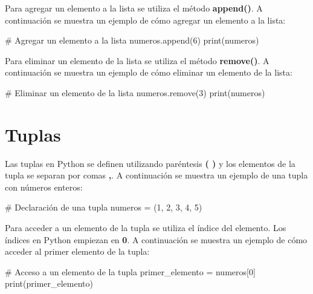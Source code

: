 \documentclass[
  a4paper,
  DIV=11,
  numbers=noendperiod,
  onepage,
  openany]{scrreprt}
\newenvironment{Shaded}{\begin{snugshade}}{\end{snugshade}}
\newcommand{\BuiltInTok}[1]{\textcolor[rgb]{0.00,0.23,0.31}{#1}}
\newcommand{\CommentTok}[1]{\textcolor[rgb]{0.37,0.37,0.37}{#1}}
\newcommand{\DecValTok}[1]{\textcolor[rgb]{0.68,0.00,0.00}{#1}}
\newcommand{\NormalTok}[1]{\textcolor[rgb]{0.00,0.23,0.31}{#1}}
\newcommand{\OperatorTok}[1]{\textcolor[rgb]{0.37,0.37,0.37}{#1}}
\begin{document}
Para agregar un elemento a la lista se utiliza el método
\textbf{append()}. A continuación se muestra un ejemplo de cómo agregar
un elemento a la lista:

\begin{Shaded}
\begin{Highlighting}[]
\CommentTok{\# Agregar un elemento a la lista}
\NormalTok{numeros.append(}\DecValTok{6}\NormalTok{)}
\BuiltInTok{print}\NormalTok{(numeros)}
\end{Highlighting}
\end{Shaded}

Para eliminar un elemento de la lista se utiliza el método
\textbf{remove()}. A continuación se muestra un ejemplo de cómo eliminar
un elemento de la lista:

\begin{Shaded}
\begin{Highlighting}[]
\CommentTok{\# Eliminar un elemento de la lista}
\NormalTok{numeros.remove(}\DecValTok{3}\NormalTok{)}
\BuiltInTok{print}\NormalTok{(numeros)}
\end{Highlighting}
\end{Shaded}

\section{Tuplas}\label{tuplas}

Las tuplas en Python se definen utilizando paréntesis \textbf{( )} y los
elementos de la tupla se separan por comas \textbf{,}. A continuación se
muestra un ejemplo de una tupla con números enteros:

\begin{Shaded}
\begin{Highlighting}[]
\CommentTok{\# Declaración de una tupla}
\NormalTok{numeros }\OperatorTok{=}\NormalTok{ (}\DecValTok{1}\NormalTok{, }\DecValTok{2}\NormalTok{, }\DecValTok{3}\NormalTok{, }\DecValTok{4}\NormalTok{, }\DecValTok{5}\NormalTok{)}
\end{Highlighting}
\end{Shaded}

Para acceder a un elemento de la tupla se utiliza el índice del
elemento. Los índices en Python empiezan en \textbf{0}. A continuación
se muestra un ejemplo de cómo acceder al primer elemento de la tupla:

\begin{Shaded}
\begin{Highlighting}[]
\CommentTok{\# Acceso a un elemento de la tupla}
\NormalTok{primer\_elemento }\OperatorTok{=}\NormalTok{ numeros[}\DecValTok{0}\NormalTok{]}
\BuiltInTok{print}\NormalTok{(primer\_elemento)}
\end{Highlighting}
\end{Shaded}
\end{document}
